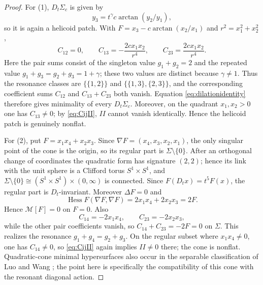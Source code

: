 \documentclass[preprint,12pt]{elsarticle}
\numberwithin{equation}{section}
\theoremstyle{definition}\newtheorem{definition}[theorem]{Definition}
\theoremstyle{remark}\newtheorem{remark}[theorem]{Remark}
\begin{document}
\begin{proof}
For (1), $D_t\Sigma_c$ is given by
\[
y_3=t^\gamma c\arctan(y_2/y_1),
\]
so it is again a helicoid patch. With $F=x_3-c\arctan(x_2/x_1)$ and $r^2=x_1^2+x_2^2$,
\[
C_{12}=0,\qquad C_{13}=-\frac{2cx_1x_2}{r^4},\qquad C_{23}=\frac{2cx_1x_2}{r^4}.
\]
Here the pair sums consist of the singleton value $g_1+g_2=2$ and the repeated value $g_1+g_3=g_2+g_3=1+\gamma$; these two values are distinct because $\gamma\ne1$. Thus the resonance classes are $\{\{1,2\}\}$ and $\{\{1,3\},\{2,3\}\}$, and the corresponding coefficient sums $C_{12}$ and $C_{13}+C_{23}$ both vanish. Equation \eqref{eq:dilationidentity} therefore gives minimality of every $D_t\Sigma_c$. Moreover, on the quadrant $x_1,x_2>0$ one has $C_{13}\ne0$; by \eqref{eq:CijII}, $II$ cannot vanish identically. Hence the helicoid patch is genuinely nonflat.

For (2), put $F=x_1x_4+x_2x_3$. Since $\nabla F=(x_4,x_3,x_2,x_1)$, the only singular point of the cone is the origin, so its regular part is $\Sigma\setminus\{0\}$. After an orthogonal change of coordinates the quadratic form has signature $(2,2)$; hence its link with the unit sphere is a Clifford torus $S^1\times S^1$, and $\Sigma\setminus\{0\}\cong(S^1\times S^1)\times(0,\infty)$ is connected. Since $F(D_tx)=t^5F(x)$, the regular part is $D_t$-invariant. Moreover $\Delta F=0$ and
\begin{equation}\label{eq:cone-hess}
\operatorname{Hess}F(\nabla F,\nabla F)=2x_1x_4+2x_2x_3=2F.
\end{equation}
Hence $\mathcal M[F]=0$ on $F=0$. Also
\[
C_{14}=-2x_1x_4,\qquad C_{23}=-2x_2x_3,
\]
while the other pair coefficients vanish, so $C_{14}+C_{23}=-2F=0$ on $\Sigma$. This realizes the resonance $g_1+g_4=g_2+g_3$. On the regular subset where $x_1x_4\ne0$, one has $C_{14}\ne0$, so \eqref{eq:CijII} again implies $II\ne0$ there; the cone is nonflat. Quadratic-cone minimal hypersurfaces also occur in the separable classification of Luo and Wang \cite{LuoWang2025}; the point here is specifically the compatibility of this cone with the resonant diagonal action.
\end{proof}
\end{document}
